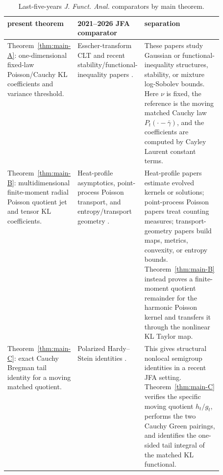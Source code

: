 \begin{table}[h]
\caption{Last-five-years \emph{J. Funct. Anal.} comparators by main theorem.}
\label{tab:intro-jfa-comparison}
{\scriptsize
\setlength{\tabcolsep}{3pt}
\renewcommand{\arraystretch}{1.16}
\begin{tabularx}{\linewidth}{>{\raggedright\arraybackslash}p{0.20\linewidth}|%
>{\raggedright\arraybackslash}p{0.31\linewidth}|%
>{\raggedright\arraybackslash}X}
\textbf{present theorem}
& \textbf{2021--2026 JFA comparator}
& \textbf{separation}\\
\hline
Theorem~\ref{thm:main-A}: one-dimensional fixed-law Poisson/Cauchy KL
coefficients and variance threshold.
& Esscher-transform CLT and recent stability/functional-inequality papers
\cite{BobkovGotzeEsscher2025,BrigatiDolbeaultSimonov2024LogSobolev,
Carlen2025LogHLS,ChenChewiNilesWeed2021MixtureLogSobolev}.
& These papers study Gaussian or functional-inequality structures, stability,
or mixture log-Sobolev bounds.  Here \(\nu\) is fixed, the reference is the
moving matched Cauchy law \(P_t(\cdot-\bar\gamma)\), and the coefficients are
computed by Cayley Laurent constant terms.\\
\hline
Theorem~\ref{thm:main-B}: multidimensional finite-moment radial Poisson
quotient jet and tensor KL coefficients.
& Heat-profile asymptotics, point-process Poisson transport, and
entropy/transport geometry
\cite{AnkerPapageorgiouZhang2023HeatSymmetricSpaces,
GozlanHerryPeccati2021PointMeasureTransport,
LopezRiveraShenfeld2025PoissonTransport,
ErbarHuesmannJalowyMuller2025StationaryPointTransport,
ChengThalmaierWang2023EntropySteinTransport}.
& Heat-profile papers estimate evolved kernels or solutions; point-process
Poisson papers treat counting measures; transport-geometry papers build maps,
metrics, convexity, or entropy bounds.  Theorem~\ref{thm:main-B} instead
proves a finite-moment quotient remainder for the harmonic Poisson kernel and
transfers it through the nonlinear KL Taylor map.\\
\hline
Theorem~\ref{thm:main-C}: exact Cauchy Bregman tail identity for a moving
matched quotient.
& Polarized Hardy--Stein identities
\cite{BogdanGutowskiPietruskaPaluba2025PolarizedHardyStein}.
& This gives structural nonlocal semigroup identities in a recent JFA setting.
Theorem~\ref{thm:main-C} verifies the specific moving quotient \(h_t/g_t\),
performs the two Cauchy Green pairings, and identifies the one-sided tail
integral of the matched KL functional.\\
\end{tabularx}
}
\end{table}

